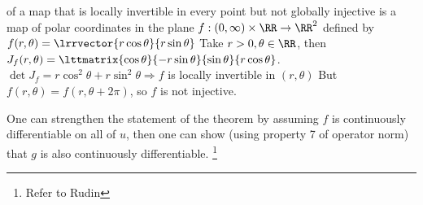 \begin{exam} of a map that is locally invertible in every point but not globally injective is a map of polar coordinates in the plane $f:(0,\infty) \times \RR \rightarrow \RR^2$ defined by $f(r, \theta) = \lrrvector{r \cos\theta}{r \sin\theta}$
  Take $r > 0, \theta \in \RR$, then $J_f(r, \theta) = \lttmatrix{\cos\theta}{-r\sin\theta}{\sin\theta}{r\cos\theta}$.
  $\det{J_f} = r\cos^2\theta + r\sin^2\theta \Rightarrow f$ is locally invertible in $(r, \theta)$
  But $f(r,\theta) = f(r, \theta + 2\pi)$, so $f$ is not injective.
\end{exam}

\begin{rem}
  One can strengthen the statement of the theorem by assuming $f$ is continuously differentiable on all of $u$, then one can show (using property 7 of operator norm) that $g$ is also continuously differentiable. \footnote{Refer to Rudin}
\end{rem}